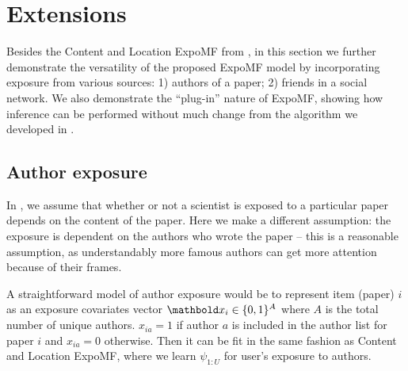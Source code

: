 \section{Extensions}

Besides the Content and Location ExpoMF from , in this section we further demonstrate the versatility of the proposed ExpoMF model by incorporating exposure from various sources: 1) authors of a paper; 2) friends in a social network. We also demonstrate the ``plug-in'' nature of ExpoMF, showing how inference can be performed without much change from the algorithm we developed in .

\subsection{Author exposure}

In , we assume that whether or not a scientist is exposed to a particular paper depends on the content of the paper. Here we make a different assumption: the exposure is dependent on the authors who wrote the paper -- this is a reasonable assumption, as understandably more famous authors can get more attention because of their frames. 



% 

A straightforward model of author exposure would be to represent item (paper) $i$ as an exposure covariates vector $\mbx_i \in \{0, 1\}^A$ where $A$ is the total number of unique authors. $x_{ia} = 1$ if author $a$ is included in the author list for paper $i$ and $x_{ia} = 0$ otherwise. Then it can be fit in the same fashion as Content and Location ExpoMF, where we learn $\psi_{1:U}$ for user's exposure to authors.  

